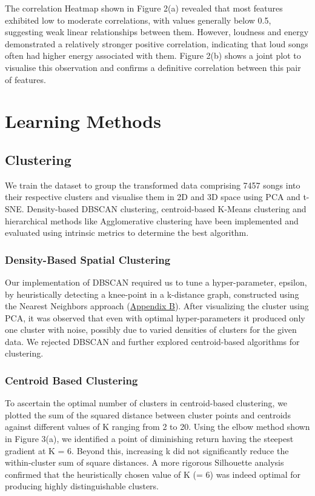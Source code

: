 \documentclass{article}
\begin{document}
The correlation Heatmap shown in Figure 2(a) revealed that most features exhibited low to moderate correlations, with values generally below 0.5, suggesting weak linear relationships between them. However, loudness and energy demonstrated a relatively stronger positive correlation, indicating that loud songs often had higher energy associated with them. Figure 2(b) shows a joint plot to visualise this observation and confirms a definitive correlation between this pair of features.


\section{Learning Methods}
\subsection{Clustering}

We train the dataset to group the transformed data comprising 7457 songs into their respective clusters and visualise them in 2D and 3D space using PCA and t-SNE. Density-based DBSCAN clustering\cite{latex9e}, centroid-based K-Means clustering and hierarchical methods like Agglomerative clustering\cite{latex8e} have been implemented and evaluated using intrinsic metrics to determine the best algorithm.

\subsubsection{Density-Based Spatial Clustering}
Our implementation of DBSCAN required us to tune a hyper-parameter, epsilon, by heuristically detecting a knee-point in a k-distance graph, constructed using the Nearest Neighbors approach (\hyperref[app:DBSCAN]{Appendix B}). After visualizing the cluster using PCA, it was observed that even with optimal hyper-parameters it produced only one cluster with noise, possibly due to varied densities of clusters for the given data. We rejected DBSCAN and further explored centroid-based algorithms for clustering.

\subsubsection{Centroid Based Clustering}

To ascertain the optimal number of clusters in centroid-based clustering, we plotted the sum of the squared distance between cluster points and centroids against different values of K ranging from 2 to 20. Using the elbow method shown in Figure 3(a), we identified a point of diminishing return having the steepest gradient at K = 6. Beyond this, increasing k did not significantly reduce the within-cluster sum of square distances. A more rigorous Silhouette analysis confirmed that the heuristically chosen value of K (= 6) was indeed optimal for producing highly distinguishable clusters.
\end{document}
